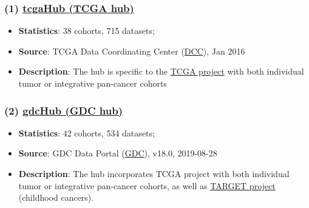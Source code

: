 \documentclass[
]{book}
\providecommand{\tightlist}{%
  \setlength{\itemsep}{0pt}\setlength{\parskip}{0pt}}
\begin{document}
\subsubsection*{\texorpdfstring{(1) \href{https://xenabrowser.net/datapages/?host=https\%3A\%2F\%2Ftcga.xenahubs.net&removeHub=https\%3A\%2F\%2Fxena.treehouse.gi.ucsc.edu\%3A443}{tcgaHub (TCGA hub)}}{(1) tcgaHub (TCGA hub)}}\label{tcgahub-tcga-hub}

\begin{itemize}
\tightlist
\item
  \textbf{Statistics}: 38 cohorts, 715 datasets;
\item
  \textbf{Source}: TCGA Data Coordinating Center (\href{https://www.cancer.gov/ccg/research/genome-sequencing/tcga}{DCC}), Jan 2016
\item
  \textbf{Description}: The hub is specific to the \href{https://www.cancer.gov/ccg/research/genome-sequencing/tcga}{TCGA project} with both individual tumor or integrative pan-cancer cohorts
\end{itemize}

\subsubsection*{\texorpdfstring{(2) \href{https://xenabrowser.net/datapages/?host=https\%3A\%2F\%2Fgdc.xenahubs.net&removeHub=https\%3A\%2F\%2Fxena.treehouse.gi.ucsc.edu\%3A443}{gdcHub (GDC hub)}}{(2) gdcHub (GDC hub)}}\label{gdchub-gdc-hub}

\begin{itemize}
\tightlist
\item
  \textbf{Statistics}: 42 cohorts, 534 datasets;
\item
  \textbf{Source}: GDC Data Portal (\href{https://portal.gdc.cancer.gov/}{GDC}), v18.0, 2019-08-28
\item
  \textbf{Description}: The hub incorporates TCGA project with both individual tumor or integrative pan-cancer cohorts, as well as \href{https://www.cancer.gov/ccg/research/genome-sequencing/target}{TARGET project} (childhood cancers).
\end{itemize}
\end{document}
